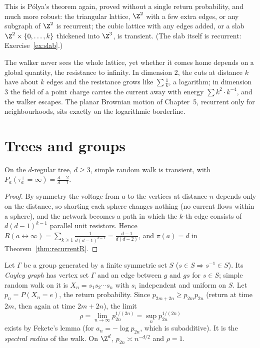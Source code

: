 This is P\'olya's theorem again, proved without a single return probability, and much more robust: the triangular lattice, $\Z^2$ with a few extra edges, or any subgraph of $\Z^2$ is recurrent; the cubic lattice with
any edges added, or a slab $\Z^2\times\{0,\dots,k\}$ thickened into $\Z^3$, is transient. (The slab itself is recurrent: Exercise~\ref{ex:slab}.)

\begin{beauty}
The walker never sees the whole lattice, yet whether it comes home depends on a global quantity, the resistance to infinity. In dimension $2$, the cuts at distance $k$ have about $k$ edges and the resistance grows
like $\sum\frac1k$, a logarithm; in dimension $3$ the field of a point charge carries the current away with energy $\sum k^{2}\cdot k^{-4}$, and the walker escapes. The planar Brownian motion of Chapter~5, recurrent
only for neighbourhoods, sits exactly on the logarithmic borderline.
\end{beauty}

\section{Trees and groups}

\begin{proposition}\label{prop:treetransient}
On the $d$-regular tree, $d\ge3$, simple random walk is transient, with $P_a(\tau_a^+=\infty)=\frac{d-2}{d-1}$.
\end{proposition}

\begin{proof}
By symmetry the voltage from $a$ to the vertices at distance $n$ depends only on the distance, so shorting each sphere changes nothing (no current flows within a sphere), and the network becomes a path in which
the $k$-th edge consists of $d(d-1)^{k-1}$ parallel unit resistors. Hence $R(a\leftrightarrow\infty)=\sum_{k\ge1}\frac1{d(d-1)^{k-1}}=\frac{d-1}{d(d-2)}$, and $\pi(a)=d$ in Theorem~\ref{thm:recurrentR}.
\end{proof}

Let $\Gamma$ be a group generated by a finite symmetric set $S$ ($s\in S\Rightarrow s^{-1}\in S$). Its \emph{Cayley graph} has vertex set $\Gamma$ and an edge between $g$ and $gs$ for $s\in S$; simple random walk on it is
$X_n=s_1s_2\cdots s_n$ with $s_i$ independent and uniform on $S$. Let $p_n=P(X_n=e)$, the return probability. Since $p_{2m+2n}\ge p_{2m}p_{2n}$ (return at time $2m$, then again at time $2m+2n$), the limit
\[
\rho=\lim_{n\to\infty}p_{2n}^{1/(2n)}=\sup_np_{2n}^{1/(2n)}
\]
exists by Fekete's lemma (for $a_n=-\log p_{2n}$, which is subadditive). It is the \emph{spectral radius} of the walk. On $\Z^d$, $p_{2n}\asymp n^{-d/2}$ and $\rho=1$.


